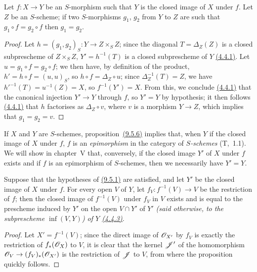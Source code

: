 \begin{cor}[9.5.6]
\label{cor-1.9.5.6}
Let $f\colon X\to Y$ be an $S$-morphism such that $Y$ is the closed image of $X$ under $f$.
Let $Z$ be an $S$-scheme; if two $S$-morphisms $g_1$, $g_2$ from $Y$ to $Z$ are such that $g_1\circ f=g_2\circ f$ then $g_1=g_2$.
\end{cor}

\begin{proof}
\label{proof-cor-1.9.5.6}
Let $h=(g_1,g_2)_S\colon Y\to Z\times_S Z$; since the diagonal $T=\Delta_Z(Z)$ is a closed subprescheme of $Z\times_S Z$, $Y'=h^{-1}(T)$ is a closed subprescheme of $Y$ \hyperref[prop-1.4.4.1]{(4.4.1)}.
Let $u=g_1\circ f=g_2\circ f$; we then have, by definition of the product, $h'=h\circ f=(u,u)_S$, so $h\circ f=\Delta_Z\circ u$; since $\Delta_Z^{-1}(T)=Z$, we have $h'^{-1}(T)=u^{-1}(Z)=X$, so $f^{-1}(Y')=X$.
From this, we conclude \hyperref[prop-1.4.4.1]{(4.4.1)} that the canonical injection $Y'\to Y$  through $f$, so $Y'=Y$ by hypothesis; it then follows \hyperref[prop-1.4.4.1]{(4.4.1)} that $h$ factorises as $\Delta_Z\circ v$, where $v$ is a morphism $Y\to Z$, which implies that $g_1=g_2=v$.
\end{proof}

\begin{rmk}[9.5.7]
\label{rmk-1.9.5.7}
If $X$ and $Y$ are $S$-schemes, proposition~\hyperref[cor-1.9.5.6]{(9.5.6)} implies that, when $Y$ if the closed image of $X$ under $f$, $f$ is an {\it epimorphism} in the category of {\it $S$-schemes} (T,~1.1).
We will show in chapter~V that, conversely, if the closed image $Y'$ of $X$ under $f$ exists and if $f$ is an epimorphism of $S$-schemes, then we necessarily have $Y'=Y$.
\end{rmk}

\begin{prop}[9.5.8]
\label{prop-1.9.5.8}
Suppose that the hypotheses of \hyperref[prop-1.9.5.1]{(9.5.1)} are satisfied, and let $Y'$ be the closed image of $X$ under $f$.
For every open $V$ of $Y$, let $f_V\colon f^{-1}(V)\to V$ be the restriction of $f$; then the closed image of $f^{-1}(V)$ under $f_V$ in $V$ exists and is equal to the prescheme induced by $Y'$ on the open $V\cap Y'$ of $Y'$ {\it (said otherwise, to the subprescheme $\inf(V,Y)$) of $Y$ \hyperref[cor-1.4.4.3]{(4.4.3)}}.
\end{prop}

\begin{proof}
\label{proof-prop-1.9.5.8}
Let $X'=f^{-1}(V)$; since the direct image of $\mathscr{O}_{X'}$ by $f_V$ is exactly the restriction of $f_*(\mathscr{O}_X)$ to $V$, it is clear that the kernel $\mathscr{J}'$ of the homomorphism $\mathscr{O}_V\to(f_V)_*(\mathscr{O}_{X'})$ is the restriction of $\mathscr{J}$ to $V$, from where the proposition quickly follows.
\end{proof}

